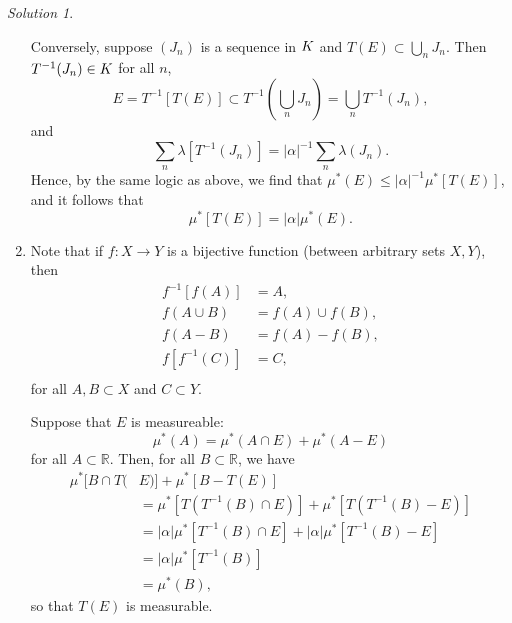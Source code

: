 \documentclass{report}
\newcommand{\bb}[1]{\mathbb{#1}}
\let\sc\relax
\newcommand{\sc}[1]{\mathscr{#1}}
\theoremstyle{remark}
\newtheorem*{solution}{Solution}
\begin{document}
\begin{solution}
\begin{enumerate}[label=(\alph*)]
      Conversely, suppose $(J_n)$ is a sequence in $\sc K$ and $T(E) \subset \bigcup_n J_n$. Then $T^{-1}(J_n) \in \sc K$ for all $n$,
      \begin{equation*}
        E = T^{-1}[T(E)] \subset T^{-1} \left( \bigcup_n J_n \right) = \bigcup_n T^{-1}(J_n),
      \end{equation*}
      and
      \begin{equation*}
        \sum_n \lambda[T^{-1}(J_n)] = |\alpha|^{-1} \sum_n \lambda(J_n).
      \end{equation*}
      Hence, by the same logic as above, we find that $\mu^*(E) \le |\alpha|^{-1} \mu^*[T(E)]$, and it follows that
      \begin{equation*}
        \mu^*[T(E)] = |\alpha| \mu^*(E).
      \end{equation*}

    \item Note that if $f: X \to Y$ is a bijective function (between arbitrary sets $X,Y$), then
      \begin{equation*}
        \begin{split}
          f^{-1}[f(A)] &= A, \\
          f(A \cup B) &= f(A) \cup f(B), \\
          f(A - B) &= f(A) - f(B), \\
          f[f^{-1}(C)] &= C, \\
        \end{split}
      \end{equation*}
      for all $A, B \subset X$ and $C \subset Y$.

      Suppose that $E$ is measureable:
      \begin{equation*}
        \mu^*(A) = \mu^*(A \cap E) + \mu^*(A - E)
      \end{equation*}
      for all $A \subset \bb R$. Then, for all $B \subset \bb R$, we have
      \begin{equation*}
        \begin{split}
          \mu^*[B \cap T(&E)] + \mu^*[B - T(E)] \\
          &= \mu^*[T(T^{-1}(B) \cap E)] + \mu^*[T(T^{-1}(B) - E)] \\
          &= |\alpha| \mu^*[T^{-1}(B) \cap E] + |\alpha| \mu^*[T^{-1}(B) - E] \\
          &= |\alpha| \mu^*[T^{-1}(B)] \\
          &= \mu^*(B),
        \end{split}
      \end{equation*}
      so that $T(E)$ is measurable.


\end{enumerate}
\end{solution}
\end{document}
